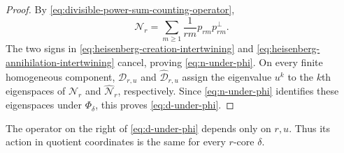 \documentclass[12pt,reqno,a4paper]{amsart}
\numberwithin{equation}{section}
\numberwithin{figure}{section}
\theoremstyle{plain}
\theoremstyle{definition}
\begin{document}
\begin{proof}
By \eqref{eq:divisible-power-sum-counting-operator},
\[
 \mathcal N_r
 =\sum_{m\geq1}\frac{1}{rm}p_{rm}p_{rm}^{\perp}.
\]
The two signs in
\eqref{eq:heisenberg-creation-intertwining} and
\eqref{eq:heisenberg-annihilation-intertwining} cancel, proving
\eqref{eq:n-under-phi}.  On every finite homogeneous component,
$\mathcal D_{r,u}$ and $\widehat{\mathcal D}_{r,u}$ assign the
eigenvalue $u^k$ to the $k$th eigenspaces of $\mathcal N_r$ and
$\widehat{\mathcal N}_r$, respectively.
Since \eqref{eq:n-under-phi} identifies these eigenspaces under
$\Phi_\delta$, this proves
\eqref{eq:d-under-phi}.
\end{proof}

The operator on the right of \eqref{eq:d-under-phi} depends only on
$r,u$.  Thus its action in quotient coordinates is the same for
every $r$-core $\delta$.
\end{document}
